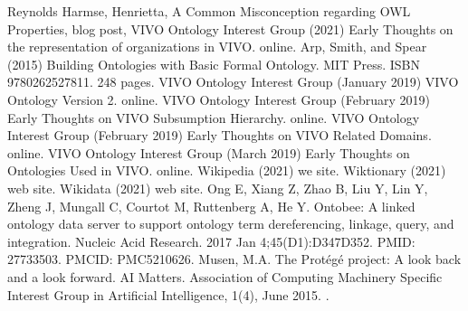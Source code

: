 \documentclass[letterpaper,10pt,english]{sphinxmanual}
\begin{document}
\begin{sphinxthebibliography}{Reynolds}
\sphinxAtStartPar
Harmse, Henrietta, A Common Misconception regarding OWL Properties,
blog post,
\sphinxAtStartPar
VIVO Ontology Interest Group (2021) Early Thoughts on the representation
of organizations in VIVO.  on\sphinxhyphen{}line.  
\sphinxAtStartPar
Arp, Smith, and Spear (2015) Building Ontologies with Basic Formal Ontology.
MIT Press. ISBN 978\sphinxhyphen{}0262527811.  248 pages.
\sphinxAtStartPar
VIVO Ontology Interest Group (January 2019) VIVO Ontology Version 2.
on\sphinxhyphen{}line.
\sphinxAtStartPar
VIVO Ontology Interest Group (February 2019) Early Thoughts on VIVO
Subsumption Hierarchy.  on\sphinxhyphen{}line.  
\sphinxAtStartPar
VIVO Ontology Interest Group (February 2019) Early Thoughts on VIVO
Related Domains.  on\sphinxhyphen{}line.  
\sphinxAtStartPar
VIVO Ontology Interest Group (March 2019) Early Thoughts on Ontologies
Used in VIVO.  on\sphinxhyphen{}line.  
\sphinxAtStartPar
Wikipedia (2021) we site.  
\sphinxAtStartPar
Wiktionary (2021) web site. 
\sphinxAtStartPar
Wikidata (2021) web site. 
\sphinxAtStartPar
Ong E, Xiang Z, Zhao B, Liu Y, Lin Y, Zheng J, Mungall C, Courtot M,
Ruttenberg A, He Y. Ontobee: A linked ontology data server to support ontology term
dereferencing, linkage, query, and integration. Nucleic Acid Research. 2017
Jan 4;45(D1):D347\sphinxhyphen{}D352. PMID: 27733503. PMCID: PMC5210626.
\sphinxAtStartPar
Musen, M.A. The Protégé project: A look back and a look forward. AI
Matters.
Association of Computing Machinery Specific Interest Group in Artificial Intelligence,
1(4), June 2015. .

\end{sphinxthebibliography}
\end{document}
